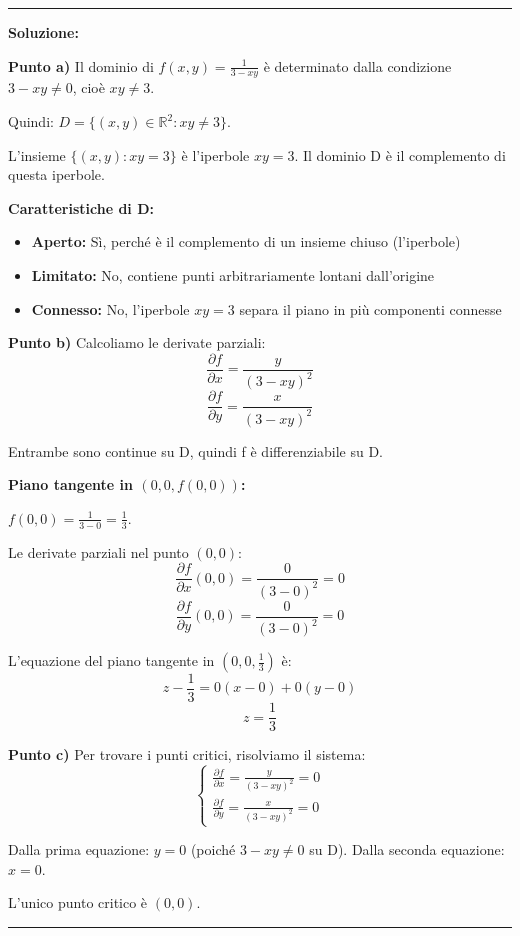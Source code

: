 \documentclass[12pt, a4paper]{article}
\newenvironment{solution}
{\par\noindent\rule{\textwidth}{0.4pt}\par\textbf{Soluzione:}\medskip\par}
{\par\rule{\textwidth}{0.4pt}\par\bigskip}
\begin{document}
\begin{solution}
\textbf{Punto a)} Il dominio di $f(x,y) = \frac{1}{3-xy}$ è determinato dalla condizione $3 - xy \neq 0$, cioè $xy \neq 3$.

Quindi: $D = \{(x,y) \in \mathbb{R}^2 : xy \neq 3\}$.

L'insieme $\{(x,y) : xy = 3\}$ è l'iperbole $xy = 3$. Il dominio D è il complemento di questa iperbole.

\textbf{Caratteristiche di D:}
\begin{itemize}
    \item \textbf{Aperto:} Sì, perché è il complemento di un insieme chiuso (l'iperbole)
    \item \textbf{Limitato:} No, contiene punti arbitrariamente lontani dall'origine
    \item \textbf{Connesso:} No, l'iperbole $xy = 3$ separa il piano in più componenti connesse
\end{itemize}

\vspace{0.5cm}

\textbf{Punto b)} Calcoliamo le derivate parziali:
\[
\frac{\partial f}{\partial x} = \frac{y}{(3-xy)^2}
\]
\[
\frac{\partial f}{\partial y} = \frac{x}{(3-xy)^2}
\]

Entrambe sono continue su D, quindi f è differenziabile su D.

\textbf{Piano tangente in $(0,0,f(0,0))$:}

$f(0,0) = \frac{1}{3-0} = \frac{1}{3}$.

Le derivate parziali nel punto $(0,0)$:
\[
\frac{\partial f}{\partial x}(0,0) = \frac{0}{(3-0)^2} = 0
\]
\[
\frac{\partial f}{\partial y}(0,0) = \frac{0}{(3-0)^2} = 0
\]

L'equazione del piano tangente in $(0,0,\frac{1}{3})$ è:
\[
z - \frac{1}{3} = 0(x - 0) + 0(y - 0)
\]
\[
z = \frac{1}{3}
\]

\vspace{0.5cm}

\textbf{Punto c)} Per trovare i punti critici, risolviamo il sistema:
\[
\begin{cases}
\frac{\partial f}{\partial x} = \frac{y}{(3-xy)^2} = 0 \\
\frac{\partial f}{\partial y} = \frac{x}{(3-xy)^2} = 0
\end{cases}
\]

Dalla prima equazione: $y = 0$ (poiché $3 - xy \neq 0$ su D).
Dalla seconda equazione: $x = 0$.

L'unico punto critico è $(0, 0)$.


\end{solution}
\end{document}
